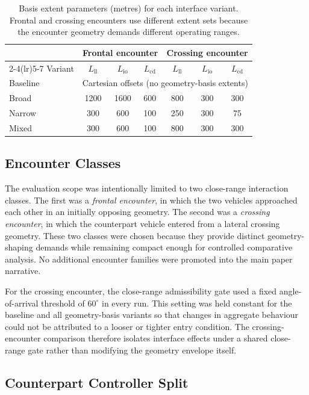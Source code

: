 \documentclass[drones,article,submit,pdftex,moreauthors]{Definitions/mdpi}
\begin{document}
\begin{table}[t]
\centering
\caption{Basis extent parameters (metres) for each interface variant. Frontal and crossing encounters use different extent sets because the encounter geometry demands different operating ranges.}
\label{tab:extent_design}
\begin{tabular}{@{}lcccccc@{}}
\toprule
& \multicolumn{3}{c}{Frontal encounter} & \multicolumn{3}{c}{Crossing encounter} \\
\cmidrule(lr){2-4}\cmidrule(lr){5-7}
Variant & $L_{\mathrm{ll}}$ & $L_{\mathrm{io}}$ & $L_{\mathrm{cd}}$ & $L_{\mathrm{ll}}$ & $L_{\mathrm{io}}$ & $L_{\mathrm{cd}}$ \\
\midrule
Baseline & \multicolumn{6}{c}{Cartesian offsets (no geometry-basis extents)} \\
Broad & 1200 & 1600 & 600 & 800 & 300 & 300 \\
Narrow & 300 & 600 & 100 & 250 & 300 & 75 \\
Mixed & 300 & 600 & 100 & 800 & 300 & 300 \\
\bottomrule
\end{tabular}
\end{table}

\subsection{Encounter Classes}

The evaluation scope was intentionally limited to two close-range interaction classes. The first was a \emph{frontal encounter}, in which the two vehicles approached each other in an initially opposing geometry. The second was a \emph{crossing encounter}, in which the counterpart vehicle entered from a lateral crossing geometry. These two classes were chosen because they provide distinct geometry-shaping demands while remaining compact enough for controlled comparative analysis. No additional encounter families were promoted into the main paper narrative.

For the crossing encounter, the close-range admissibility gate used a fixed angle-of-arrival threshold of $60^\circ$ in every run. This setting was held constant for the baseline and all geometry-basis variants so that changes in aggregate behaviour could not be attributed to a looser or tighter entry condition. The crossing-encounter comparison therefore isolates interface effects under a shared close-range gate rather than modifying the geometry envelope itself.

\subsection{Counterpart Controller Split}
\end{document}
